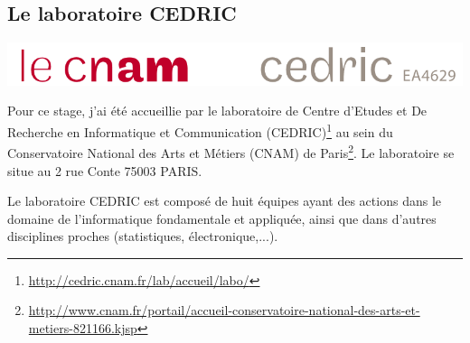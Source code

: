 \documentclass{article}
\begin{document}
	\subsection{Le laboratoire CEDRIC}
		\begin{center}
			\includegraphics[scale=0.45]{../include/logo-cedric.PNG}\\
		\end{center}
		\hspace*{0.4cm}
		Pour ce stage, j'ai été accueillie par le laboratoire de Centre d'Etudes et De Recherche en Informatique et Communication (CEDRIC)\footnote{\href{http://cedric.cnam.fr/lab/accueil/labo/}{http://cedric.cnam.fr/lab/accueil/labo/}} au sein du Conservatoire National des Arts et Métiers (CNAM) de Paris\footnote{\href{http://www.cnam.fr/portail/accueil-conservatoire-national-des-arts-et-metiers-821166.kjsp}{http://www.cnam.fr/portail/accueil-conservatoire-national-des-arts-et-metiers-821166.kjsp}}. 
		Le laboratoire se situe au 2 rue Conte 75003 PARIS.\par
		Le laboratoire CEDRIC est composé de huit équipes ayant des actions dans le domaine de l'informatique fondamentale et appliquée, ainsi que dans d'autres disciplines proches (statistiques, électronique,...).
\end{document}
